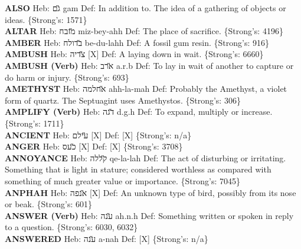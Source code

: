 {\textbf{ALSO} Heb: {\large\H גם} gam Def: In addition to. The idea of a gathering of objects or ideas. \{Strong's: 1571\}\hfill{}\\

\textbf{ALTAR} Heb: {\large\H מזבח} miz-bey-ahh Def: The place of sacrifice. \{Strong's: 4196\}\hfill{}\\

\textbf{AMBER} Heb: {\large\H בדולח} be-du-lahh Def: A fossil gum resin. \{Strong's: 916\}\hfill{}\\

\textbf{AMBUSH} Heb: {\large\H צדיה} {[}X{]} Def: A laying down in wait. \{Strong's: 6660\}\hfill{}\\

\textbf{AMBUSH (Verb)} Heb: {\large\H ארב} a.r.b Def: To lay in wait of another to capture or do harm or injury. \{Strong's: 693\}\hfill{}\\

\textbf{AMETHYST} Heb: {\large\H אחלמה} ahh-la-mah Def: Probably the Amethyst, a violet form of quartz. The Septuagint uses Amethystos. \{Strong's: 306\}\hfill{}\\

\textbf{AMPLIFY (Verb)} Heb: {\large\H דגה} d.g.h Def: To expand, multiply or increase. \{Strong's: 1711\}\hfill{}\\

\textbf{ANCIENT} Heb: {\large\H עילם} {[}X{]} Def: {[}X{]} \{Strong's: n/a\}\hfill{}\\

\textbf{ANGER} Heb: {\large\H כעס} {[}X{]} Def: {[}X{]} \{Strong's: 3708\}\hfill{}\\

\textbf{ANNOYANCE} Heb: {\large\H קללה} qe-la-lah Def: The act of disturbing or irritating. Something that is light in stature; considered worthless as compared with something of much greater value or importance. \{Strong's: 7045\}\hfill{}\\

\textbf{ANPHAH} Heb: {\large\H אנפה} {[}X{]} Def: An unknown type of bird, possibly from its nose or beak. \{Strong's: 601\}\hfill{}\\

\textbf{ANSWER (Verb)} Heb: {\large\H ענה} ah.n.h Def: Something written or spoken in reply to a question. \{Strong's: 6030, 6032\}\hfill{}\\

\textbf{ANSWERED} Heb: {\large\H ענה} a-nah Def: {[}X{]} \{Strong's: n/a\}\hfill{}\\

}
